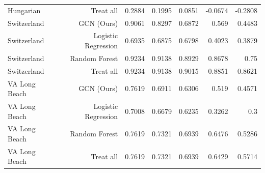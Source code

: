 \begin{table}[t]
\begin{tabular}{lrrrrrr}
Hungarian & Treat all & 0.2884 & 0.1995 & 0.0851 & -0.0674 & -0.2808 \\
Switzerland & GCN (Ours) & 0.9061 & 0.8297 & 0.6872 & 0.569 & 0.4483 \\
Switzerland & Logistic Regression & 0.6935 & 0.6875 & 0.6798 & 0.4023 & 0.3879 \\
Switzerland & Random Forest & 0.9234 & 0.9138 & 0.8929 & 0.8678 & 0.75 \\
Switzerland & Treat all & 0.9234 & 0.9138 & 0.9015 & 0.8851 & 0.8621 \\
VA Long Beach & GCN (Ours) & 0.7619 & 0.6911 & 0.6306 & 0.519 & 0.4571 \\
VA Long Beach & Logistic Regression & 0.7008 & 0.6679 & 0.6235 & 0.3262 & 0.3 \\
VA Long Beach & Random Forest & 0.7619 & 0.7321 & 0.6939 & 0.6476 & 0.5286 \\
VA Long Beach & Treat all & 0.7619 & 0.7321 & 0.6939 & 0.6429 & 0.5714 \\
\bottomrule
\end{tabular}
\end{table}
